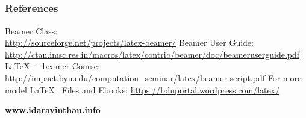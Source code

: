 \documentclass[[newPxFont]{beamer}
\begin{document}
\subsection{}
\begin{frame}
  \frametitle{References}
\begin{block}{}
\begin{scriptsize}
\begin{thebibliography}{30}
Beamer Class:\\ \url{http://sourceforge.net/projects/latex-beamer/}
Beamer User Guide:\\
\url{http://ctan.imsc.res.in/macros/latex/contrib/beamer/doc/beameruserguide.pdf}
\LaTeX~ - beamer Course:
\url{http://impact.byu.edu/computation_seminar/latex/beamer-script.pdf}
{\color{red}For more model \LaTeX~ Files and Ebooks:
\url{https://bduportal.wordpress.com/latex/}}
\end{thebibliography}
\end{scriptsize}
\end{block}

\end{frame}
\begin{frame}[plain]
\vspace{4.35cm}
\begin{center}
\textbf{\color{green} {\Large www.idaravinthan.info}}
\end{center}
\end{frame}
\end{document}
